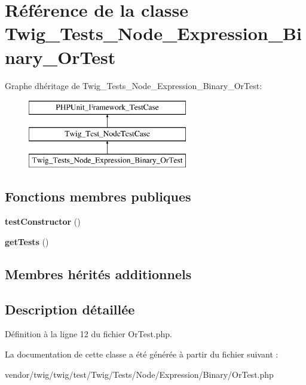 \hypertarget{class_twig___tests___node___expression___binary___or_test}{}\section{Référence de la classe Twig\+\_\+\+Tests\+\_\+\+Node\+\_\+\+Expression\+\_\+\+Binary\+\_\+\+Or\+Test}
\label{class_twig___tests___node___expression___binary___or_test}
Graphe d\textquotesingle{}héritage de Twig\+\_\+\+Tests\+\_\+\+Node\+\_\+\+Expression\+\_\+\+Binary\+\_\+\+Or\+Test\+:\begin{figure}[H]
\begin{center}
\leavevmode
\includegraphics[height=3.000000cm]{class_twig___tests___node___expression___binary___or_test}
\end{center}
\end{figure}
\subsection*{Fonctions membres publiques}
\begin{DoxyCompactItemize}
\item 
{\bfseries test\+Constructor} ()\hypertarget{class_twig___tests___node___expression___binary___or_test_a47094dc941e72950570900d1418f89c6}{}\label{class_twig___tests___node___expression___binary___or_test_a47094dc941e72950570900d1418f89c6}

\item 
{\bfseries get\+Tests} ()\hypertarget{class_twig___tests___node___expression___binary___or_test_a7e247dd31cc8d37a6c97353a062a0080}{}\label{class_twig___tests___node___expression___binary___or_test_a7e247dd31cc8d37a6c97353a062a0080}

\end{DoxyCompactItemize}
\subsection*{Membres hérités additionnels}


\subsection{Description détaillée}


Définition à la ligne 12 du fichier Or\+Test.\+php.



La documentation de cette classe a été générée à partir du fichier suivant \+:\begin{DoxyCompactItemize}
\item 
vendor/twig/twig/test/\+Twig/\+Tests/\+Node/\+Expression/\+Binary/Or\+Test.\+php\end{DoxyCompactItemize}
